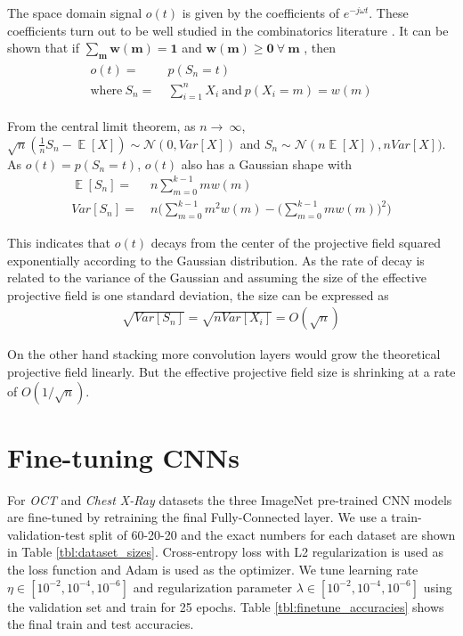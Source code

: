 The space domain signal $o(t)$ is given by the coefficients of $e^{-j\omega t}$.
These coefficients turn out to be well studied in the combinatorics literature \cite{eger2013restricted}.
It can be shown that if $\mathbf{\sum_{m}w(m) = 1}$  and $\mathbf{w(m) \geq 0 ~\forall~ m}$ , then
\begin{align}
\begin{split}
	o(t) =&~ p(S_n=t)\\ 
	\text{where}~ S_n =&~ \sum_{i=1}^{n} X_i ~\text{and}~p(X_i=m) = w(m)
\end{split}
\end{align}

From the central limit theorem, as $n \rightarrow~\infty$, $\sqrt{n}(\frac{1}{n}S_n - \mathop{\mathbb{E}}[X]) \sim \mathcal{N}(0, Var[X])$ and $S_n \sim \mathcal{N}(n\mathop{\mathbb{E}}[X]), nVar[X])$.
As $o(t) = p(S_n=t)$, $o(t)$ also has a Gaussian shape with
\begin{align}
	\mathop{\mathbb{E}}[S_n] =&~ n\sum_{m=0}^{k-1}mw(m)\\
	Var[S_n] =&~ n \Bigg(\sum_{m=0}^{k-1}m^2w(m) - \Big(\sum_{m=0}^{k-1}mw(m)\Big)^2 \Bigg)
\end{align}

This indicates that $o(t)$ decays from the center of the projective field squared exponentially according to the Gaussian distribution.
As the rate of decay is related to the variance of the Gaussian and assuming the size of the effective projective field is one standard deviation, the size can be expressed as
\begin{align}
	\sqrt{Var[S_n]} = \sqrt{nVar[X_i]} = O(\sqrt{n})
\end{align}

On the other hand stacking more convolution layers would grow the theoretical projective field linearly. But the effective projective field size is shrinking at a rate of $O(1/\sqrt{n})$.

\section{Fine-tuning CNNs}

For \textit{OCT} and \textit{Chest X-Ray} datasets the three ImageNet pre-trained CNN models are fine-tuned by retraining the final Fully-Connected layer.
We use a train-validation-test split of 60-20-20 and the exact numbers for each dataset are shown in Table \ref{tbl:dataset_sizes}.
Cross-entropy loss with L2 regularization is used as the loss function and  Adam \cite{kingma2014adam} is used as the optimizer.
We tune learning rate $\eta \in [10^{-2}, 10^{-4}, 10^{-6}]$ and regularization parameter $\lambda \in [10^{-2}, 10^{-4}, 10^{-6}]$ using the validation set and train for 25 epochs.
Table \ref{tbl:finetune_accuracies} shows the final train and test accuracies.

